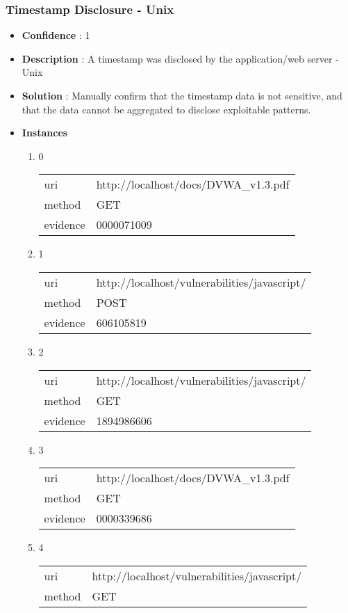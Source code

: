 \documentclass[10pt]{article}
\begin{document}
\subsubsection{Timestamp Disclosure - Unix}
\begin{itemize}
\item[] \textbf{Confidence} : 1
\item[] \textbf{Description} : A timestamp was disclosed by the application/web server - Unix
\item[] \textbf{Solution} :  Manually confirm that the timestamp data is not sensitive, and that the data cannot be aggregated to disclose exploitable patterns.
\item[] \textbf{Instances}
\begin{enumerate}
\item[] 0
\begin{tabular}{| l | p{14cm}}
uri & http://localhost/docs/DVWA{\_}v1.3.pdf \\
method & GET \\
evidence & 0000071009 \\
\end{tabular}
\item[] 1
\begin{tabular}{| l | p{14cm}}
uri & http://localhost/vulnerabilities/javascript/ \\
method & POST \\
evidence & 606105819 \\
\end{tabular}
\item[] 2
\begin{tabular}{| l | p{14cm}}
uri & http://localhost/vulnerabilities/javascript/ \\
method & GET \\
evidence & 1894986606 \\
\end{tabular}
\item[] 3
\begin{tabular}{| l | p{14cm}}
uri & http://localhost/docs/DVWA{\_}v1.3.pdf \\
method & GET \\
evidence & 0000339686 \\
\end{tabular}
\item[] 4
\begin{tabular}{| l | p{14cm}}
uri & http://localhost/vulnerabilities/javascript/ \\
method & GET \\

\end{tabular}
\end{enumerate}
\end{itemize}
\end{document}
